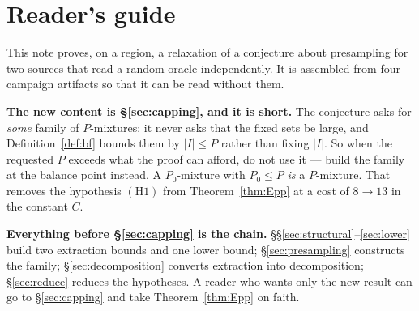 \documentclass{aicr-solution}
\begin{document}


\vspace{0.4em}

\section*{Reader's guide}

\noindent This note proves, on a region, a relaxation of a conjecture about
presampling for two sources that read a random oracle independently. It is
assembled from four campaign artifacts so that it can be read without them.

\smallskip
\noindent\textbf{The new content is \S\ref{sec:capping}, and it is short.} The
conjecture asks for \emph{some} family of $P$-mixtures; it never asks that the
fixed sets be large, and Definition~\ref{def:bf} bounds them by $|I| \le P$ rather
than fixing $|I|$. So when the requested $P$ exceeds what the proof can afford, do
not use it --- build the family at the balance point instead. A $P_0$-mixture with
$P_0 \le P$ \emph{is} a $P$-mixture. That removes the hypothesis $(\mathrm{H1})$
from Theorem~\ref{thm:Epp} at a cost of $8 \to 13$ in the constant $C$.

\smallskip
\noindent\textbf{Everything before \S\ref{sec:capping} is the chain.}
\S\S\ref{sec:structural}--\ref{sec:lower} build two extraction bounds and one
lower bound; \S\ref{sec:presampling} constructs the family;
\S\ref{sec:decomposition} converts extraction into decomposition;
\S\ref{sec:reduce} reduces the hypotheses. A reader who wants only the new result
can go to \S\ref{sec:capping} and take Theorem~\ref{thm:Epp} on faith.
\end{document}
